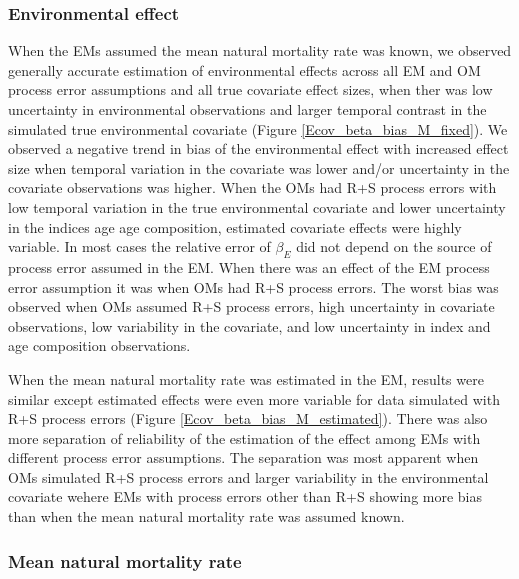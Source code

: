 \documentclass[
  12pt,
]{article}
\begin{document}
\hypertarget{environmental-effect}{%
\subsubsection*{Environmental effect}\label{environmental-effect}}

When the EMs assumed the mean natural mortality rate was known, we observed generally accurate estimation of environmental effects across all EM and OM process error assumptions and all true covariate effect sizes, when ther was low uncertainty in environmental observations and larger temporal contrast in the simulated true environmental covariate (Figure \ref{Ecov_beta_bias_M_fixed}). We observed a negative trend in bias of the environmental effect with increased effect size when temporal variation in the covariate was lower and/or uncertainty in the covariate observations was higher. When the OMs had R+S process errors with low temporal variation in the true environmental covariate and lower uncertainty in the indices age age composition, estimated covariate effects were highly variable. In most cases the relative error of \(\beta_E\) did not depend on the source of process error assumed in the EM. When there was an effect of the EM process error assumption it was when OMs had R+S process errors. The worst bias was observed when OMs assumed R+S process errors, high uncertainty in covariate observations, low variability in the covariate, and low uncertainty in index and age composition observations.

When the mean natural mortality rate was estimated in the EM, results were similar except estimated effects were even more variable for data simulated with R+S process errors (Figure \ref{Ecov_beta_bias_M_estimated}). There was also more separation of reliability of the estimation of the effect among EMs with different process error assumptions. The separation was most apparent when OMs simulated R+S process errors and larger variability in the environmental covariate wehere EMs with process errors other than R+S showing more bias than when the mean natural mortality rate was assumed known.

\hypertarget{mean-natural-mortality-rate}{%
\subsubsection*{Mean natural mortality rate}\label{mean-natural-mortality-rate}}
\end{document}
